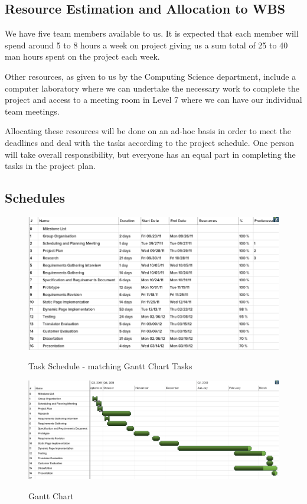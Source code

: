 \documentclass{l3proj}
\begin{document}
\subsection{Resource Estimation and Allocation to WBS}
We have five team members available to us. It is expected that each member will spend around 5 to 8 hours a week on project giving us a sum total of 25 to 40 man hours spent on the project each week.

Other resources, as given to us by the Computing Science department, include a
computer laboratory where we can undertake the necessary work to complete the
project and access to a meeting room in Level 7 where we can have our
individual team meetings.

Allocating these resources will be done on an ad-hoc basis in order to meet the deadlines and deal with the tasks according to the project schedule.
One person will take overall responsibility, but everyone has an equal part in completing the tasks in the project plan.

\subsection{Schedules}

\begin{figure}
\begin{center}
\label{fig:gantttasks}
\includegraphics[scale=0.5, angle=90]{images/tasks}
\caption{\small{Task Schedule - matching Gantt Chart Tasks}}
\end{center}
\end{figure}

\begin{figure}
\begin{center}
\label{fig:ganttchart}
\includegraphics[scale=0.5, angle=90]{gantt}
\caption{\small{Gantt Chart}}
\end{center}
\end{figure}
\end{document}
